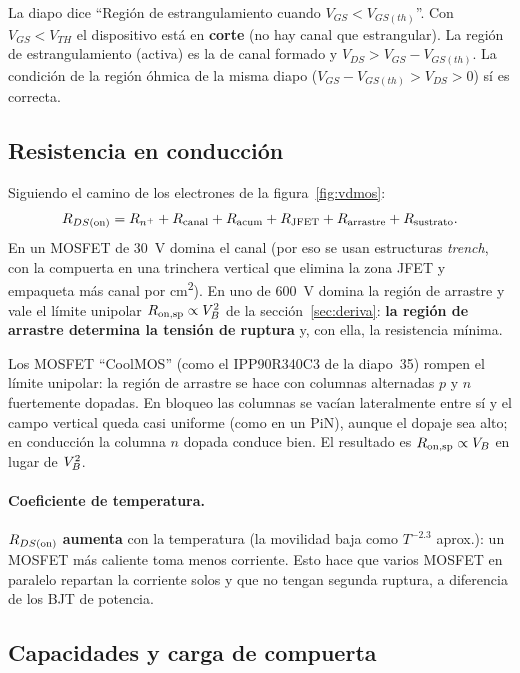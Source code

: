 \begin{ojo}
La diapo dice ``Región de estrangulamiento cuando $V_{GS}<V_{GS(th)}$''. Con $V_{GS}<V_{TH}$ el
dispositivo está en \textbf{corte} (no hay canal que estrangular). La región de estrangulamiento
(activa) es la de canal formado y $V_{DS}>V_{GS}-V_{GS(th)}$. La condición de la región óhmica de la
misma diapo ($V_{GS}-V_{GS(th)}>V_{DS}>0$) sí es correcta.
\end{ojo}

\subsection{Resistencia en conducción}

Siguiendo el camino de los electrones de la figura~\ref{fig:vdmos}:
\[
  R_{DS(\mathrm{on})}=R_{n^+}+R_{\mathrm{canal}}+R_{\mathrm{acum}}+R_{\mathrm{JFET}}+R_{\mathrm{arrastre}}+R_{\mathrm{sustrato}} .
\]
En un MOSFET de \SI{30}{V} domina el canal (por eso se usan estructuras \emph{trench}, con la
compuerta en una trinchera vertical que elimina la zona JFET y empaqueta más canal por
\si{cm^2}). En uno de \SI{600}{V} domina la región de arrastre y vale el límite unipolar
$R_{\mathrm{on,sp}}\propto V_{B}^2$ de la sección~\ref{sec:deriva}: \textbf{la región de arrastre determina la
tensión de ruptura}  y, con ella, la resistencia mínima.

\begin{intuicion}[La superjuntura]
Los MOSFET ``CoolMOS'' (como el IPP90R340C3 de la diapo~35) rompen el límite unipolar: la región de
arrastre se hace con columnas alternadas $p$ y $n$ fuertemente dopadas. En bloqueo las columnas se
vacían lateralmente entre sí y el campo vertical queda casi uniforme (como en un PiN), aunque el dopaje
sea alto; en conducción la columna $n$ dopada conduce bien. El resultado es $R_{\mathrm{on,sp}}\propto V_{B}$ en lugar
de $V_{B}^2$.
\end{intuicion}

\paragraph{Coeficiente de temperatura.} $R_{DS(\mathrm{on})}$ \textbf{aumenta} con la temperatura (la movilidad
baja como $T^{-2.3}$ aprox.): un MOSFET más caliente toma menos corriente. Esto hace que varios
MOSFET en paralelo repartan la corriente solos y que no tengan segunda ruptura, a diferencia de los
BJT de potencia.

\subsection{Capacidades y carga de compuerta}

